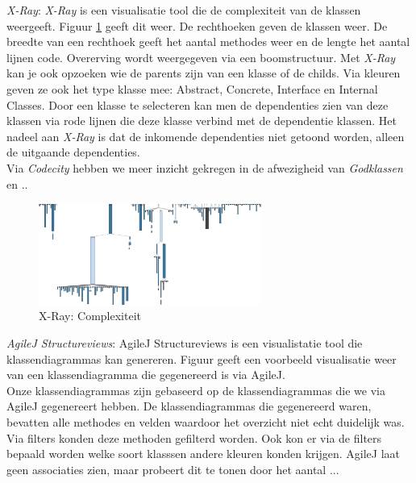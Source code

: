 \documentclass[i1]{oss}
\begin{document}
\begin{description}

\item \emph{X-Ray}: \emph{X-Ray} is een visualisatie tool die de complexiteit van de klassen weergeeft. Figuur \ref{fig:X-Ray} geeft dit weer. De rechthoeken geven de klassen weer. De breedte van een rechthoek geeft het aantal methodes weer en de lengte het aantal lijnen code. Overerving wordt weergegeven via een boomstructuur. Met \emph{X-Ray }kan je ook opzoeken wie de parents zijn van een klasse of de childs. Via kleuren geven ze ook het type klasse mee: Abstract, Concrete, Interface en Internal Classes. Door een klasse te selecteren kan men de dependenties zien van deze klassen via rode lijnen die deze klasse verbind met de dependentie klassen. Het nadeel aan \emph{X-Ray} is dat de inkomende dependenties niet getoond worden, alleen de uitgaande dependenties.  \\
Via \emph{Codecity} hebben we meer inzicht gekregen in de afwezigheid van \emph{Godklassen} en ..

\begin{figure}[hb!]
	\centering
	\includegraphics[width=0.65\textwidth]{XRayComplexity}
	\caption{X-Ray: Complexiteit}
	\label{fig:X-Ray}
\end{figure}

\item \emph{AgileJ Structureviews}: AgileJ Structureviews is een visualistatie tool die klassendiagrammas kan genereren. Figuur \label{fig:AgileJklassendia} geeft een voorbeeld visualisatie weer van een klassendiagramma die gegenereerd is via AgileJ.\\
Onze klassendiagrammas zijn gebaseerd op de klassendiagrammas die we via AgileJ gegenereert hebben. De klassendiagrammas die gegenereerd waren, bevatten alle methodes en velden waardoor het overzicht niet echt duidelijk was. Via filters konden deze methoden gefilterd worden. Ook kon er via de filters bepaald worden welke soort klasssen andere kleuren konden krijgen. AgileJ laat geen associaties zien, maar probeert dit te tonen door het aantal ... 



\end{description}
\end{document}
